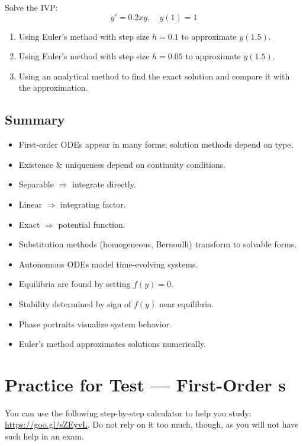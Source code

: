 \begin{example}
  Solve the IVP:
  \[y' = 0.2xy , \quad y(1) = 1\]
  \begin{enumerate}
    \item Using Euler's method with step size \(h = 0.1\) to approximate \(y(1.5)\).
    \item Using Euler's method with step size \(h = 0.05\) to approximate \(y(1.5)\).
    \item Using an analytical method to find the exact solution and compare it with the approximation.
  \end{enumerate}
\end{example}



\subsection*{Summary}
\begin{itemize}
    \item First-order ODEs appear in many forms; solution methods depend on type.
    \item Existence \& uniqueness depend on continuity conditions.
    \item Separable $\Rightarrow$ integrate directly.
    \item Linear $\Rightarrow$ integrating factor.
    \item Exact $\Rightarrow$ potential function.
    \item Substitution methods (homogeneous, Bernoulli) transform to solvable forms.
    \item Autonomous ODEs model time-evolving systems.
    \item Equilibria are found by setting \(f(y) = 0\).
    \item Stability determined by sign of \(f(y)\) near equilibria.
    \item Phase portraits visualize system behavior.
    \item Euler's method approximates solutions numerically.
\end{itemize}



\section{Practice for Test --- First-Order \ode{}s}
You can use the following step-by-step calculator to help you study: \url{https://goo.gl/sZEyvL}. Do not rely on it too much, though, as you will not have such help in an exam.

